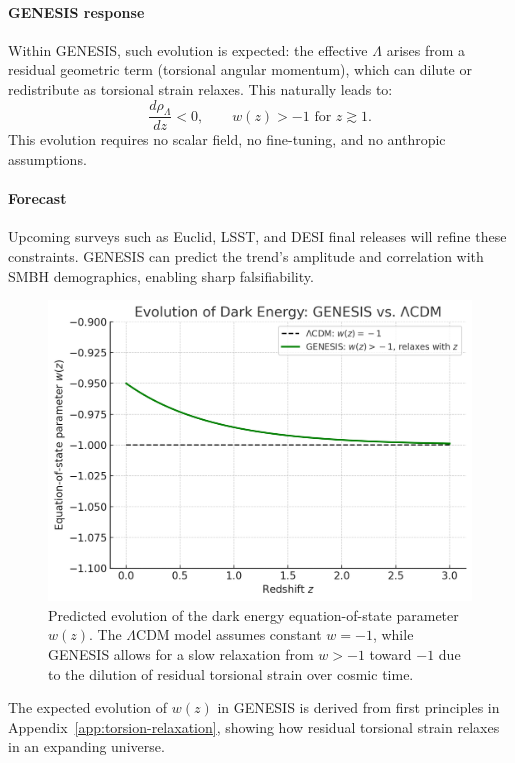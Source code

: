 \documentclass{article}
\begin{document}
\paragraph{GENESIS response}
Within GENESIS, such evolution is expected: the effective $\Lambda$ arises from a residual geometric term (torsional angular momentum), which can dilute or redistribute as torsional strain relaxes. This naturally leads to:
\[
  \frac{d\rho_\Lambda}{dz} < 0,
  \qquad
  w(z) > -1 \text{ for } z \gtrsim 1.
\]
This evolution requires no scalar field, no fine-tuning, and no anthropic assumptions.

\paragraph{Forecast}
Upcoming surveys such as Euclid, LSST, and DESI final releases will refine these constraints. GENESIS can predict the trend's amplitude and correlation with SMBH demographics, enabling sharp falsifiability.

\begin{figure}[h!]
  \centering
  \includegraphics[width=0.68\linewidth]{wz_GENESIS_vs_LCDM.png}
  \caption{Predicted evolution of the dark energy equation-of-state parameter $w(z)$.
           The $\Lambda$CDM model assumes constant $w=-1$, while GENESIS allows for a slow relaxation
           from $w>-1$ toward $-1$ due to the dilution of residual torsional strain over cosmic time.}
  \label{fig:wz-comparison}
\end{figure}

The expected evolution of $w(z)$ in GENESIS is derived from first principles in Appendix~\ref{app:torsion-relaxation}, showing how residual torsional strain relaxes in an expanding universe.
\end{document}
